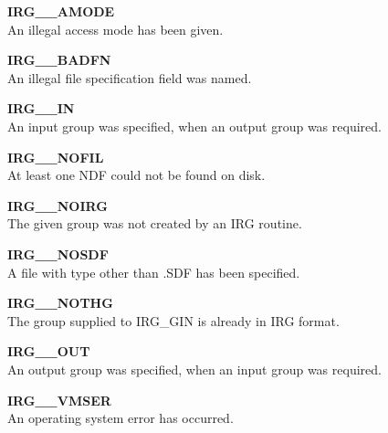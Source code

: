 \begin{description}

\item {\bf IRG\_\_AMODE}\\  
An illegal access mode has been given.

\item {\bf IRG\_\_BADFN}\\  
An illegal file specification field was named.

\item {\bf IRG\_\_IN}\\  
An input group was specified, when an output group was required.

\item {\bf IRG\_\_NOFIL}\\
At least one NDF could not be found on disk.

\item {\bf IRG\_\_NOIRG}\\  
The given group was not created by an IRG routine.

\item {\bf IRG\_\_NOSDF}\\  
A file with type other than .SDF has been specified.

\item {\bf IRG\_\_NOTHG}\\  
The group supplied to IRG\_GIN is already in IRG format.

\item {\bf IRG\_\_OUT}\\  
An output group was specified, when an input group was required.

\item {\bf IRG\_\_VMSER}\\  
An operating system error has occurred.

\end{description}

